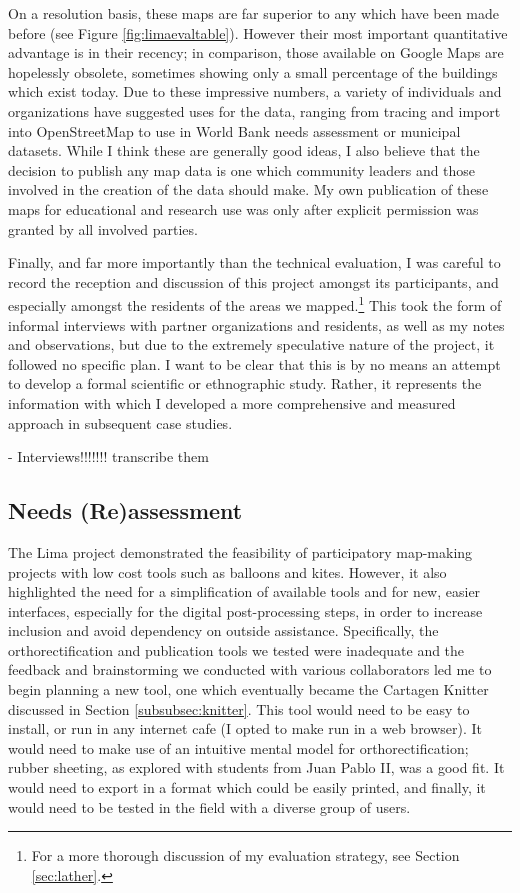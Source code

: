 \documentclass[11pt,oneside,notitlepage]{report}
\begin{document}
On a resolution basis, these maps are far superior to any which have been made before (see Figure \ref{fig:limaevaltable}). However their most important quantitative advantage is in their recency; in comparison, those available on Google Maps are hopelessly obsolete, sometimes showing only a small percentage of the buildings which exist today. Due to these impressive numbers, a variety of individuals and organizations have suggested uses for the data, ranging from tracing and import into OpenStreetMap to use in World Bank needs assessment or municipal datasets. While I think these are generally good ideas, I also believe that the decision to publish any map data is one which community leaders and those involved in the creation of the data should make. My own publication of these maps for educational and research use was only after explicit permission was granted by all involved parties. 

Finally, and far more importantly than the technical evaluation, I was careful to record the reception and discussion of this project amongst its participants, and especially amongst the residents of the areas we mapped.\footnote{For a more thorough discussion of my evaluation strategy, see Section \ref{sec:lather}.} This took the form of informal interviews with partner organizations and residents, as well as my notes and observations, but due to the extremely speculative nature of the project, it followed no specific plan. I want to be clear that this is by no means an attempt to develop a formal scientific or ethnographic study. Rather, it represents the information with which I developed a more comprehensive and measured approach in subsequent case studies.   

- Interviews!!!!!!! transcribe them



\subsection{Needs (Re)assessment}

The Lima project demonstrated the feasibility of participatory map-making projects with low cost tools such as balloons and kites. However, it also highlighted the need for a simplification of available tools and for new, easier interfaces, especially for the digital post-processing steps, in order to increase inclusion and avoid dependency on outside assistance. Specifically, the orthorectification and publication tools we tested were inadequate and the feedback and brainstorming we conducted with various collaborators led me to begin planning a new tool, one which eventually became the Cartagen Knitter discussed in Section \ref{subsubsec:knitter}. This tool would need to be easy to install, or run in any internet cafe (I opted to make run in a web browser). It would need to make use of an intuitive mental model for orthorectification; rubber sheeting, as explored with students from Juan Pablo II, was a good fit. It would need to export in a format which could be easily printed, and finally, it would need to be tested in the field with a diverse group of users. 
\end{document}
